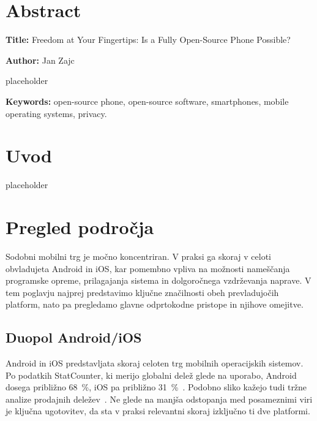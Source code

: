 \documentclass[a4paper,12pt,openright]{book}
\newcommand{\ttitleEn}{Freedom at Your Fingertips: Is a Fully Open-Source Phone Possible?}
\newcommand{\tauthor}{Jan Zajc}
\newcommand{\tkeywordsEn}{open-source phone, open-source software, smartphones, mobile operating systems, privacy}
\newcommand{\clearemptydoublepage}{\newpage{\pagestyle{empty}\cleardoublepage}}
\begin{document}
\chapter*{Abstract}

\noindent\textbf{Title:} \ttitleEn
\bigskip

\noindent\textbf{Author:} \tauthor
\bigskip

\noindent placeholder
\bigskip

\noindent\textbf{Keywords:} \tkeywordsEn.
\clearemptydoublepage

\mainmatter
\setcounter{page}{1}
\pagestyle{fancy}

\chapter{Uvod}
\label{chap:uvod}
placeholder

\chapter{Pregled področja}
\label{chap:pregled_podrocja}

Sodobni mobilni trg je močno koncentriran.
V praksi ga skoraj v celoti obvladujeta Android in iOS, kar pomembno vpliva na možnosti nameščanja programske opreme, prilagajanja sistema in dolgoročnega vzdrževanja naprave.
V tem poglavju najprej predstavimo ključne značilnosti obeh prevladujočih platform, nato pa pregledamo glavne odprtokodne pristope in njihove omejitve.

\section{Duopol Android/iOS}
\label{sec:duopol}

Android in iOS predstavljata skoraj celoten trg mobilnih operacijskih sistemov.
Po podatkih StatCounter, ki merijo globalni delež glede na uporabo, Android dosega približno 68~\%, iOS pa približno 31~\%~\cite{statcounter_mobileos_2025}.
Podobno sliko kažejo tudi tržne analize prodajnih deležev~\cite{counterpoint_os_share_2025}.
Ne glede na manjša odstopanja med posameznimi viri je ključna ugotovitev, da sta v praksi relevantni skoraj izključno ti dve platformi.
\end{document}
